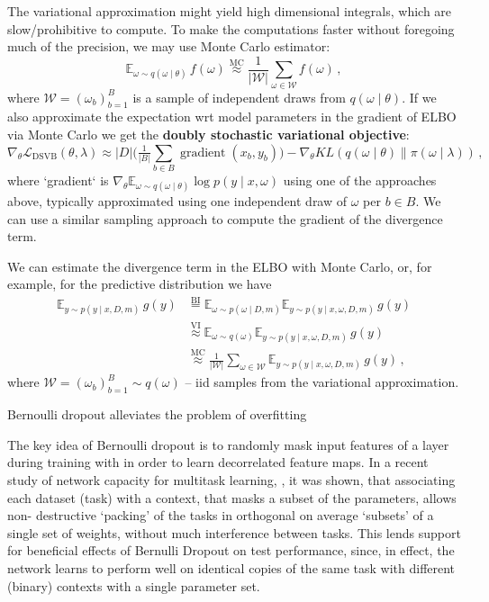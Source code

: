 \documentclass[a4paper,10pt]{article}
\begin{document}
The variational approximation might yield high dimensional integrals, which are slow/prohibitive
to compute. To make the computations faster without foregoing much of the precision, we may use
Monte Carlo estimator:
$$
\mathbb{E}_{\omega \sim q(\omega\mid \theta)} \, f(\omega)
  \overset{\text{MC}}{\approx}
    \frac1{\lvert \mathcal{W}\rvert}
      \sum_{\omega \in \mathcal{W}} f(\omega)
  \,, $$
where $\mathcal{W} = (\omega_b)_{b=1}^B$ is a sample of independent draws from $
  q(\omega\mid \theta)
$. If we also approximate the expectation wrt model parameters in the gradient of ELBO via Monte
Carlo we get the \textbf{doubly stochastic variational objective}:
$$
\nabla_\theta \mathcal{L}_\mathrm{DSVB}(\theta, \lambda)
  \approx
    \lvert D \rvert \biggl(
      \tfrac1{\lvert B \rvert}
        \sum_{b \in B}
          \mathop{gradient}(x_b, y_b)
    \biggr)
    - \nabla_\theta KL(q(\omega \mid \theta) \| \pi(\omega \mid \lambda))
  \,, $$
where `gradient` is $
  \nabla_\theta
    \mathbb{E}_{\omega \sim q(\omega \mid \theta)}
      \log p(y \mid x, \omega)
$ using one of the approaches above, typically approximated using one independent draw of $\omega$
per $b\in B$. We can use a similar sampling approach to compute the gradient of the divergence term.

We can estimate the divergence term in the ELBO with Monte Carlo, or, for example, for the
predictive distribution we have
\begin{align}
\mathbb{E}_{y\sim p(y\mid x, D, m)} \, g(y)
  &
  \overset{\text{BI}}{=}
    \mathbb{E}_{\omega\sim p(\omega \mid D, m)}
      \mathbb{E}_{y\sim p(y\mid x, \omega, D, m)} \, g(y)
  \\
  &
  \overset{\text{VI}}{\approx}
    \mathbb{E}_{\omega\sim q(\omega)}
      \mathbb{E}_{y\sim p(y\mid x, \omega, D, m)} \, g(y)
  \\
  &
  \overset{\text{MC}}{\approx}
    \frac1{\lvert \mathcal{W}\rvert} \sum_{\omega \in \mathcal{W}}
      \mathbb{E}_{y\sim p(y\mid x, \omega, D, m)} \, g(y)
  \,,
\end{align}
where $\mathcal{W} = (\omega_b)_{b=1}^B \sim q(\omega)$ -- iid samples from the variational
approximation.

\bigskip

Bernoulli dropout alleviates the problem of overfitting

The key idea of Bernoulli dropout is to randomly mask input features of a layer during
training with in order to learn decorrelated feature maps. In a recent study of network
capacity for multitask learning, \cite{multitask2019}, it was shown, that associating
each dataset (task) with a context, that masks a subset of the parameters, allows non-%
destructive `packing' of the tasks in orthogonal on average `subsets' of a single set
of weights, without much interference between tasks. This lends support for beneficial
effects of Bernulli Dropout on test performance, since, in effect, the network learns
to perform well on identical copies of the same task with different (binary) contexts
with a single parameter set.
\end{document}
